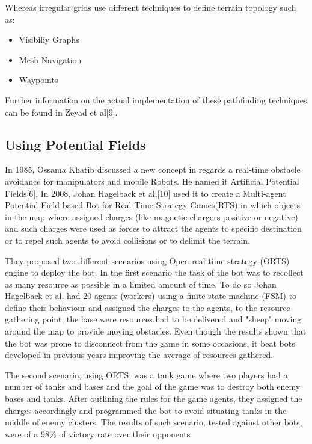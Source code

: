 \vspace{2mm}
Whereas irregular grids use different techniques to define terrain topology such as:

\begin{itemize}
	\item Visibiliy Graphs
	\item Mesh Navigation
	\item Waypoints
\end{itemize}

\vspace{2mm}
Further information on the actual implementation of these pathfinding techniques can be found in Zeyad et al[9].


\subsection{Using Potential Fields}

In 1985, Ossama Khatib discussed a new concept in regards a real-time obstacle avoidance for manipulators and mobile Robots. He named it Artificial Potential Fields[6]. In 2008, Johan Hagelback et al.[10] used it to create a Multi-agent Potential Field-based Bot for Real-Time Strategy Games(RTS) in which objects in the map where assigned charges (like magnetic chargers positive or negative) and such charges were used as forces to attract the agents to specific destination or to repel such agents to avoid collisions or to delimit the terrain.

\vspace{2mm}
They proposed two-different scenarios using Open real-time strategy (ORTS) engine to deploy the bot. In the first scenario the task of the bot was to recollect as many resource as possible in a limited amount of time. To do so Johan Hagelback et al. had 20 agents (workers) using a finite state machine (FSM) to define their behaviour and assigned the charges to the agents, to the resource gathering point, the base were resources had to be delivered and "sheep" moving around the map to provide moving obstacles. Even though the results shown that the bot was prone to disconnect from the game in some occasions, it beat bots developed in previous years improving the average of resources gathered.

\vspace{2mm}
The second scenario, using ORTS, was a tank game where two players had a number of tanks and bases and the goal of the game was to destroy both enemy bases and tanks. After outlining the rules for the game agents, they assigned the charges accordingly and programmed the bot to avoid situating tanks in the middle of enemy clusters. The results of such scenario, tested against other bots, were of a 98\% of victory rate over their opponents.


